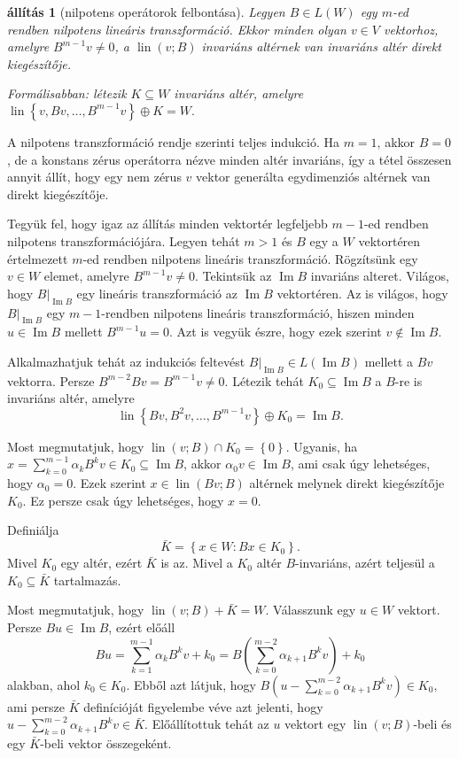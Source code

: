 \documentclass[9pt, a4paper, showtrims]{memoir}
\makeatletter
\renewenvironment{proof}[1][\proofname]
    {\par\pushQED{\qed}%
    \normalfont \topsep6\p@\@plus6\p@\relax
    \trivlist
    \item[\hskip\labelsep
        \itshape
    #1\@addpunct{:}]\ignorespaces}
    {\popQED\endtrivlist\@endpefalse}
\theoremstyle{plain}
\newtheorem{proposition}{állítás}[chapter]
\theoremstyle{remark}
\theoremstyle{definition}
\DeclareMathOperator{\lin}{lin}
\DeclareMathOperator{\im}{Im}
\makeatother
\begin{document}
\begin{proposition}[nilpotens operátorok felbontása]
	Legyen $B\in L\left( W \right)$ egy $m$-ed rendben nilpotens lineáris transzformáció.
	Ekkor minden olyan $v\in V$ vektorhoz,
	amelyre $B^{m-1}v\neq 0$, a $\lin(v;B)$ invariáns altérnek van invariáns altér
	direkt kiegészítője.

	Formálisabban: létezik $K\subseteq W$ invariáns altér, amelyre
	\(
	\lin\left\{ v,Bv,\ldots,B^{m-1}v \right\}\oplus K = W.
	\)
	\label{pr:nilpfelb}
\end{proposition}
\begin{proof}
	A nilpotens transzformáció rendje szerinti teljes indukció.
	Ha $m=1$, akkor $B=0$, de a konstans zérus operátorra nézve minden altér invariáns,
	így a tétel összesen annyit állít, hogy egy nem zérus $v$ vektor generálta egydimenziós altérnek van direkt kiegészítője.

	Tegyük fel, hogy igaz az állítás minden vektortér legfeljebb $m-1$-ed rendben nilpotens transzformációjára.
	Legyen tehát $m>1$ és $B$ egy a $W$ vektortéren értelmezett $m$-ed rendben nilpotens lineáris transzformáció.
	Rögzítsünk egy $v\in W$ elemet, amelyre $B^{m-1}v\neq 0$.
	Tekintsük az $\im B$ invariáns alteret.
	Világos, hogy $B|_{\im B}$ egy lineáris transzformáció az $\im B$ vektortéren.
	Az is világos, hogy $B|_{\im B}$ egy $m-1$-rendben nilpotens lineáris transzformáció, hiszen
	minden $u\in\im B$ mellett $B^{m-1}u=0$.
	Azt is vegyük észre, hogy ezek szerint $v\notin\im B$.

	Alkalmazhatjuk tehát az indukciós feltevést $B|_{\im B}\in L\left( \im B \right)$ mellett a
	$Bv$ vektorra.
	Persze $B^{m-2}Bv=B^{m-1}v\neq 0$.
	Létezik tehát $K_0\subseteq\im B$ a $B$-re is invariáns altér, amelyre
	\[
		\lin\left\{ Bv,B^2v,\ldots,B^{m-1}v \right\}\oplus K_0 = \im B.
	\]

	Most megmutatjuk, hogy $\lin(v;B)\cap K_0=\left\{ 0 \right\}.$
	Ugyanis, ha
	$
		x=\sum_{k=0}^{m-1}\alpha_kB^kv\in K_0\subseteq\im B
	$, akkor $\alpha_0v\in\im B$,
	ami csak úgy lehetséges, hogy $\alpha_0=0$.
	Ezek szerint $x\in\lin(Bv;B)$ altérnek melynek direkt kiegészítője $K_0$.
	Ez persze csak úgy lehetséges, hogy $x=0$.

	Definiálja
	\[
		\bar{K}=\left\{ x\in W:Bx\in K_0 \right\}.
	\]
	Mivel $K_0$ egy altér, ezért $\bar{K}$ is az.
	Mivel a $K_0$ altér $B$-invariáns, azért teljesül a $K_0\subseteq \bar{K}$ tartalmazás.

	Most megmutatjuk, hogy $\lin(v;B)+\bar{K}=W$.
	Válasszunk egy $u\in W$ vektort.
	Persze $Bu\in\im B$, ezért előáll
	\[
		Bu
		=
		\sum_{k=1}^{m-1}\alpha_kB^kv +k_0
		=
		B\left(
		\sum_{k=0}^{m-2}\alpha_{k+1}B^kv
		\right)
		+ k_0
	\]
	alakban, ahol $k_0\in K_0$.
	Ebből azt látjuk, hogy
	$
		B
		\left(
		u-
		\sum_{k=0}^{m-2}\alpha_{k+1}B^kv
		\right)
		\in
		K_0,
	$
	ami persze $\bar{K}$ definícióját figyelembe véve azt jelenti, hogy
	\(
	u-
	\sum_{k=0}^{m-2}\alpha_{k+1}B^kv
	\in
	\bar{K}.
	\)
	Előállítottuk tehát az $u$ vektort egy $\lin(v;B)$-beli és egy
	$\bar{K}$-beli vektor összegeként.


\end{proof}
\end{document}
